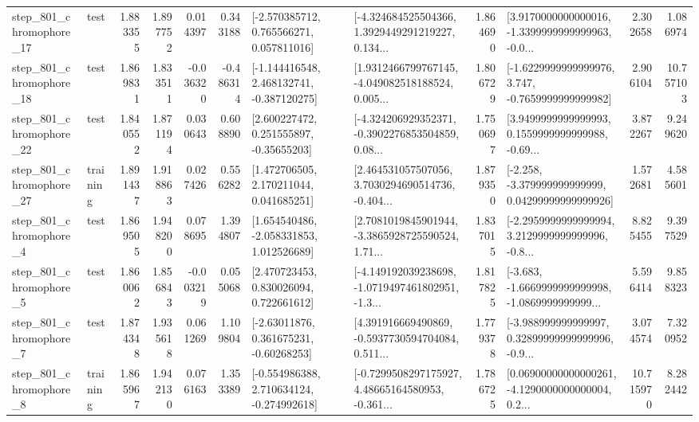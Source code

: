 \begin{tabular}{llrrrrllrlrr}
  step\_801\_chromophore\_17 &      test &      1.883355 &    1.897752 &      0.014397 &  0.343188 &    [-2.570385712, 0.765566271, 0.057811016] &  [-4.324684525504366, 1.3929449291219227, 0.134... &       1.864690 &  [3.9170000000000016, -1.3399999999999963, -0.0... &            2.302658 &          1.086974 \\
  step\_801\_chromophore\_18 &      test &      1.869831 &    1.833511 &     -0.036320 & -0.486314 &   [-1.144416548, 2.468132741, -0.387120275] &  [1.9312466799767145, -4.049082518188524, 0.005... &       1.806729 &  [-1.6229999999999976, 3.747, -0.7659999999999982] &            2.906104 &         10.757103 \\
  step\_801\_chromophore\_22 &      test &      1.840552 &    1.871194 &      0.030643 &  0.608890 &     [2.600227472, 0.251555897, -0.35655203] &  [-4.324206929352371, -0.3902276853504859, 0.08... &       1.750697 &  [3.9499999999999993, 0.1559999999999988, -0.69... &            3.872267 &          9.249620 \\
  step\_801\_chromophore\_27 &  training &      1.891437 &    1.918863 &      0.027426 &  0.556282 &     [1.472706505, 2.170211044, 0.041685251] &  [2.464531057507056, 3.7030294690514736, -0.404... &       1.879350 &  [-2.258, -3.379999999999999, 0.04299999999999926] &            1.572681 &          4.585601 \\
   step\_801\_chromophore\_4 &      test &      1.869505 &    1.948200 &      0.078695 &  1.394807 &    [1.654540486, -2.058331853, 1.012526689] &  [2.7081019845901944, -3.3865928725590524, 1.71... &       1.837015 &  [-2.2959999999999994, 3.2129999999999996, -0.8... &            8.825455 &          9.397529 \\
   step\_801\_chromophore\_5 &      test &      1.860062 &    1.856843 &     -0.003219 &  0.055068 &     [2.470723453, 0.830026094, 0.722661612] &  [-4.149192039238698, -1.0719497461802951, -1.3... &       1.817825 &  [-3.683, -1.6669999999999998, -1.0869999999999... &            5.596414 &          9.858323 \\
   step\_801\_chromophore\_7 &      test &      1.874348 &    1.935618 &      0.061269 &  1.109804 &     [-2.63011876, 0.361675231, -0.60268253] &  [4.391916669490869, -0.5937730594704084, 0.511... &       1.779378 &  [-3.988999999999997, 0.32899999999999996, -0.9... &            3.074574 &          7.320952 \\
   step\_801\_chromophore\_8 &  training &      1.865967 &    1.942130 &      0.076163 &  1.353389 &   [-0.554986388, 2.710634124, -0.274992618] &  [-0.7299508297175927, 4.48665164580953, -0.361... &       1.786725 &  [0.06900000000000261, -4.1290000000000004, 0.2... &           10.715970 &          8.282442 \\

\end{tabular}
